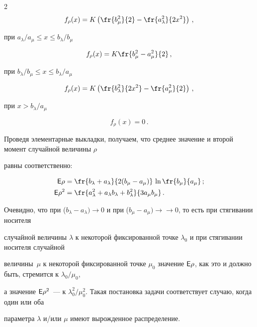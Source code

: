 \begin{multicols}{2}
$$


f_\rho(x)=K\left(\fr{b_\mu^2}{2}-\fr{a_\lambda^2}{2x^2}\right)\,,


$$


при $a_\lambda/a_\mu\le x\le b_\lambda/b_\mu$


$$


f_\rho(x)=K\fr{b_\mu^2-a_\mu^2}{2}\,,


$$


при $b_\lambda/b_\mu\le x\le b_\lambda/a_\mu$


$$


f_\rho(x)=K\left(\fr{b_\lambda^2}{2x^2}-\fr{a_\mu^2}{2}\right)\,,


$$


при $x>b_\lambda/a_\mu$


$$


f_\rho(x)=0\,.


$$





Проведя элементарные выкладки, получаем, что среднее значение и второй момент случайной величины $\rho$


равны соответственно:


\begin{align*}


\e\rho&=\fr{b_\lambda+a_\lambda}{2(b_\mu-a_\mu)}\, \ln\fr{b_\mu}{a_\mu}\,;\\


\e\rho^2&=\fr{a_\lambda^2+a_\lambda b_\lambda+b_\lambda^2}{3a_\mu b_\mu}\,.


\end{align*}





Очевидно, что при ($b_\lambda-a_\lambda)\rightarrow0$ и при ($b_\mu-a_\mu)\rightarrow$\linebreak $\rightarrow 0$, то есть при стягивании носителя


случайной величины $\lambda$ к некоторой фиксированной точке $\lambda_0$ и при стягивании носителя случайной 


величины~$\mu$ к некоторой фиксированной точке $\mu_0$ значение ${\sf E}\rho$, как это и должно быть, стремится к $\lambda_0/\mu_0$,


а значение ${\sf E}\rho^2$~--- к $\lambda_0^2/\mu_0^2$. Такая постановка задачи соответствует случаю, когда один или оба


параметра $\lambda$ и/или $\mu$ имеют вырожденное распределение.






\end{multicols}
